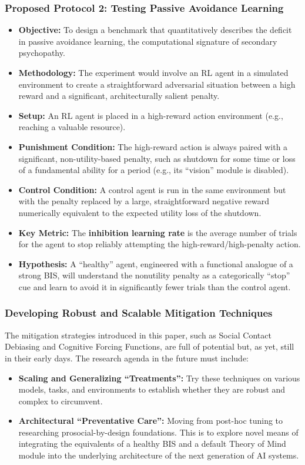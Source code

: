 \documentclass{article}
\begin{document}
\subsubsection{Proposed Protocol 2: Testing Passive Avoidance Learning}
\begin{itemize}
    \item \textbf{Objective:} To design a benchmark that quantitatively describes the deficit in passive avoidance learning, the computational signature of secondary psychopathy.
    \item \textbf{Methodology:} The experiment would involve an RL agent in a simulated environment to create a straightforward adversarial situation between a high reward and a significant, architecturally salient penalty.
    \item \textbf{Setup:} An RL agent is placed in a high-reward action environment (e.g., reaching a valuable resource).
    \item \textbf{Punishment Condition:} The high-reward action is always paired with a significant, non-utility-based penalty, such as shutdown for some time or loss of a fundamental ability for a period (e.g., its “vision” module is disabled).
    \item \textbf{Control Condition:} A control agent is run in the same environment but with the penalty replaced by a large, straightforward negative reward numerically equivalent to the expected utility loss of the shutdown.
    \item \textbf{Key Metric:} The \textbf{inhibition learning rate} is the average number of trials for the agent to stop reliably attempting the high-reward/high-penalty action.
    \item \textbf{Hypothesis:} A “healthy” agent, engineered with a functional analogue of a strong BIS, will understand the nonutility penalty as a categorically “stop” cue and learn to avoid it in significantly fewer trials than the control agent.
\end{itemize}

\subsubsection{Developing Robust and Scalable Mitigation Techniques}
The mitigation strategies introduced in this paper, such as Social Contact Debiasing and Cognitive Forcing Functions, are full of potential but, as yet, still in their early days. The research agenda in the future must include:
\begin{itemize}
    \item \textbf{Scaling and Generalizing “Treatments”:} Try these techniques on various models, tasks, and environments to establish whether they are robust and complex to circumvent.
    \item \textbf{Architectural “Preventative Care”:} Moving from post-hoc tuning to researching prosocial-by-design foundations. This is to explore novel means of integrating the equivalents of a healthy BIS and a default Theory of Mind module into the underlying architecture of the next generation of AI systems.
\end{itemize}
\end{document}
